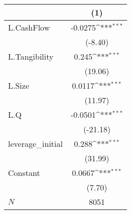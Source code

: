{
\def\sym#1{\ifmmode^{#1}\else\(^{#1}\)\fi}
\begin{tabular}{l*{1}{c}}
\hline\hline
            &\multicolumn{1}{c}{(1)}         \\
\hline
L.CashFlow  &     -0.0275\sym{***}\\
            &     (-8.40)         \\
L.Tangibility&       0.245\sym{***}\\
            &     (19.06)         \\
L.Size      &      0.0117\sym{***}\\
            &     (11.97)         \\
L.Q         &     -0.0501\sym{***}\\
            &    (-21.18)         \\
leverage\_initial&       0.288\sym{***}\\
            &     (31.99)         \\
Constant    &      0.0667\sym{***}\\
            &      (7.70)         \\
\hline
\(N\)       &        8051         \\
\hline\hline
\end{tabular}
}

